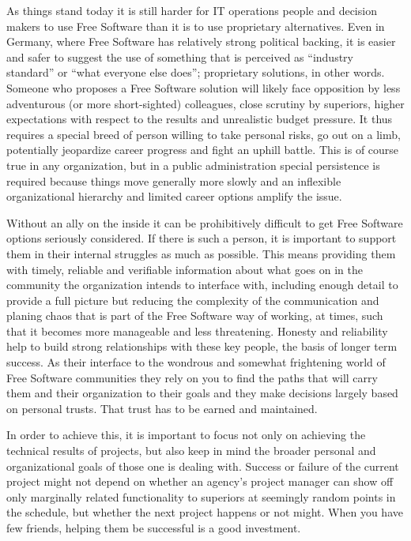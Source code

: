 As things stand today it is still harder for IT operations people and decision
makers to use Free Software than it is to use proprietary alternatives. Even in
Germany, where Free Software has relatively strong political backing, it is
easier and safer to suggest the use of something that is perceived as ``industry
standard'' or ``what everyone else does''; proprietary solutions, in other words.
Someone who proposes a Free Software solution will likely face opposition by
less adventurous (or more short-sighted) colleagues, close scrutiny by
superiors, higher expectations with respect to the results and unrealistic
budget pressure. It thus requires a special breed of person willing to take
personal risks, go out on a limb, potentially jeopardize career progress and
fight an uphill battle. This is of course true in any organization, but in a
public administration special persistence is required because things move
generally more slowly and an inflexible organizational hierarchy and limited
career options amplify the issue.

Without an ally on the inside it can be prohibitively difficult to get
Free Software options seriously considered. If there is such a person, it is important
to support them in their internal struggles as much as possible. This
means providing them with timely, reliable and verifiable information about
what goes on in the community the organization intends to interface with,
including enough detail to provide a full picture but reducing the
complexity of the communication and planing chaos that is part of the Free
Software way of working, at times, such that it becomes more manageable and
less threatening. Honesty and reliability help to build strong
relationships with these key people, the basis of longer term success. As
their interface to the wondrous and somewhat frightening world of Free
Software communities they rely on you to find the paths that will carry
them and their organization to their goals and they make decisions largely
based on personal trusts. That trust has to be earned and maintained.

In order to achieve this, it is important to focus not only on achieving
the technical results of projects, but also keep in mind the broader personal and organizational
goals of those one is dealing with. Success or failure of the current
project might not depend on whether an agency's project manager can show off
only marginally related functionality to superiors at seemingly random points
in the schedule, but whether the next project happens or not might. When you have
few friends, helping them be successful is a good investment.

